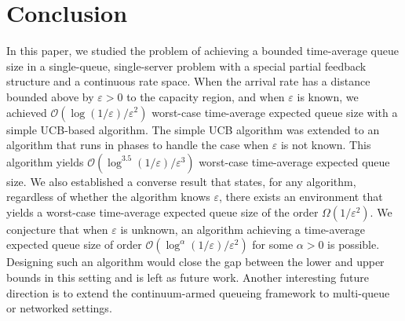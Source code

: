 \documentclass[12pt,draftcls, onecolumn]{IEEEtran}
\begin{document}
\section{Conclusion}
In this paper, we studied the problem of achieving a bounded time-average queue size in a single-queue, single-server problem with a special partial feedback structure and a continuous rate space. When the arrival rate has a distance bounded above by $\varepsilon > 0 $ to the capacity region, and when $\varepsilon$ is known, we achieved $\mathcal{O}(\log(1/\varepsilon)/\varepsilon^2)$ worst-case time-average expected queue size with a simple UCB-based algorithm. The simple UCB algorithm was extended to an algorithm that runs in phases to handle the case when $\varepsilon$ is not known. This algorithm yields $\mathcal{O}(\log^{3.5}(1/\varepsilon)/\varepsilon^3)$ worst-case time-average expected queue size.  We also established a converse result that states, for any algorithm, regardless of whether the algorithm knows $\varepsilon$, there exists an environment that yields a worst-case time-average expected queue size of the order $\Omega(1/\varepsilon^2)$. We conjecture that when $\varepsilon$ is unknown, an algorithm achieving a time-average expected queue size of order $\mathcal{O}(\log^{\alpha}(1/\varepsilon)/\varepsilon^2)$ for some $\alpha > 0$ is possible. Designing such an algorithm would close the gap between the lower and upper bounds in this setting and is left as future work. Another interesting future direction is to extend the continuum-armed queueing framework to multi-queue or networked settings.



\appendix
\end{document}
